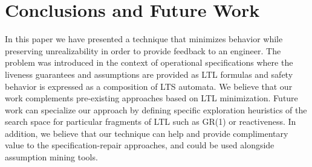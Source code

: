 \section{Conclusions and Future Work}\label{sec:conclusion}
In this paper we have presented a technique that minimizes behavior while
preserving unrealizability in order to provide feedback to an engineer.
The problem was introduced in the context of operational specifications where
the liveness guarantees and assumptions are provided as LTL formulas and safety behavior
is expressed as a composition of LTS automata.  %
We believe that our work complements pre-existing approaches based on LTL minimization. 
Future work can specialize
our approach by defining specific exploration heuristics of the search space for particular fragments of LTL such as GR(1) or reactiveness.  
In addition, we believe that our technique can help and provide complimentary value to the
specification-repair approaches, and could be used alongside assumption mining
tools. 

